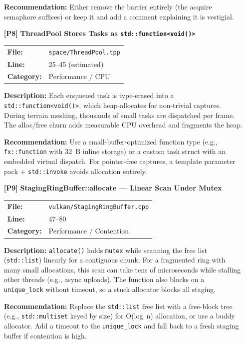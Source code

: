 \documentclass[a4paper,12pt]{article}
\newcommand{\severitybox}[2]{%
  \colorbox{#1}{\makebox[2.5cm][c]{\textcolor{white}{\textbf{#2}}}}%
}
\begin{document}
\begin{enumerate}[leftmargin=*]
  \textbf{Recommendation:}
  Either remove the barrier entirely (the acquire semaphore suffices) or
  keep it and add a comment explaining it is vestigial.

\item[\textbf{[P8]}] \textbf{ThreadPool Stores Tasks as \texttt{std::function<void()>}}
  \hfill \severitybox{mediumcolor}{MEDIUM}

  \begin{tabular}{ll}
    \textbf{File:} & \texttt{space/ThreadPool.tpp} \\
    \textbf{Line:} & 25--45 (estimated) \\
    \textbf{Category:} & Performance / CPU \\
  \end{tabular}

  \textbf{Description:}
  Each enqueued task is type-erased into a \texttt{std::function<void()>},
  which heap-allocates for non-trivial captures. During terrain meshing,
  thousands of small tasks are dispatched per frame. The alloc/free churn
  adds measurable CPU overhead and fragments the heap.

  \textbf{Recommendation:}
  Use a small-buffer-optimized function type (e.g., \texttt{fx::function}
  with 32~B inline storage) or a custom task struct with an embedded
  virtual dispatch. For pointer-free captures, a template parameter pack
  + \texttt{std::invoke} avoids allocation entirely.

\item[\textbf{[P9]}] \textbf{StagingRingBuffer::allocate — Linear Scan Under Mutex}
  \hfill \severitybox{mediumcolor}{MEDIUM}

  \begin{tabular}{ll}
    \textbf{File:} & \texttt{vulkan/StagingRingBuffer.cpp} \\
    \textbf{Line:} & 47--80 \\
    \textbf{Category:} & Performance / Contention \\
  \end{tabular}

  \textbf{Description:}
  \texttt{allocate()} holds \texttt{mutex} while scanning the free list
  (\texttt{std::list}) linearly for a contiguous chunk. For a fragmented
  ring with many small allocations, this scan can take tens of microseconds
  while stalling other threads (e.g., async uploads). The function also
  blocks on a \texttt{unique\_lock} without timeout, so a stuck allocator
  blocks all staging.

  \textbf{Recommendation:}
  Replace the \texttt{std::list} free list with a free-block tree
  (e.g., \texttt{std::multiset} keyed by size) for O(log~n) allocation,
  or use a buddy allocator. Add a timeout to the \texttt{unique\_lock} and
  fall back to a fresh staging buffer if contention is high.


\end{enumerate}
\end{document}
